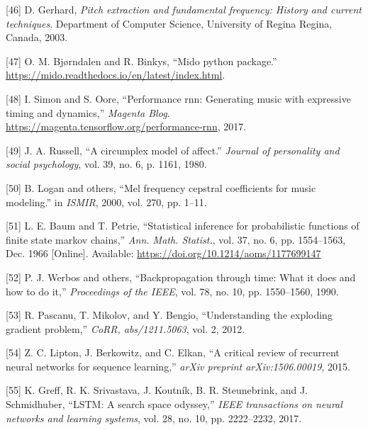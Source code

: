 \documentclass[12pt,]{article}
\begin{document}
\leavevmode\hypertarget{ref-gerhard2003pitch}{}%
{[}46{]} D. Gerhard, \emph{Pitch extraction and fundamental frequency:
History and current techniques}. Department of Computer Science,
University of Regina Regina, Canada, 2003.

\leavevmode\hypertarget{ref-mido}{}%
{[}47{]} O. M. Bjørndalen and R. Binkys, ``Mido python package.'' \\
\url{https://mido.readthedocs.io/en/latest/index.html}.

\leavevmode\hypertarget{ref-performance-rnn-2017}{}%
{[}48{]} I. Simon and S. Oore, ``Performance rnn: Generating music with
expressive timing and dynamics,'' \emph{Magenta Blog}.
\url{https://magenta.tensorflow.org/performance-rnn}, 2017.

\leavevmode\hypertarget{ref-russell1980circumplex}{}%
{[}49{]} J. A. Russell, ``A circumplex model of affect.'' \emph{Journal
of personality and social psychology}, vol. 39, no. 6, p. 1161, 1980.

\leavevmode\hypertarget{ref-logan2000mel}{}%
{[}50{]} B. Logan and others, ``Mel frequency cepstral coefficients for
music modeling.'' in \emph{ISMIR}, 2000, vol. 270, pp. 1--11.

\leavevmode\hypertarget{ref-baum1966}{}%
{[}51{]} L. E. Baum and T. Petrie, ``Statistical inference for
probabilistic functions of finite state markov chains,'' \emph{Ann.
Math. Statist.}, vol. 37, no. 6, pp. 1554--1563, Dec. 1966 {[}Online{]}.
Available: \url{https://doi.org/10.1214/aoms/1177699147}

\leavevmode\hypertarget{ref-werbos1990backpropagation}{}%
{[}52{]} P. J. Werbos and others, ``Backpropagation through time: What
it does and how to do it,'' \emph{Proceedings of the IEEE}, vol. 78, no.
10, pp. 1550--1560, 1990.

\leavevmode\hypertarget{ref-pascanu2012understanding}{}%
{[}53{]} R. Pascanu, T. Mikolov, and Y. Bengio, ``Understanding the
exploding gradient problem,'' \emph{CoRR, abs/1211.5063}, vol. 2, 2012.

\leavevmode\hypertarget{ref-lipton2015critical}{}%
{[}54{]} Z. C. Lipton, J. Berkowitz, and C. Elkan, ``A critical review
of recurrent neural networks for sequence learning,'' \emph{arXiv
preprint arXiv:1506.00019}, 2015.

\leavevmode\hypertarget{ref-greff2017lstm}{}%
{[}55{]} K. Greff, R. K. Srivastava, J. Koutník, B. R. Steunebrink, and
J. Schmidhuber, ``LSTM: A search space odyssey,'' \emph{IEEE
transactions on neural networks and learning systems}, vol. 28, no. 10,
pp. 2222--2232, 2017.
\end{document}
